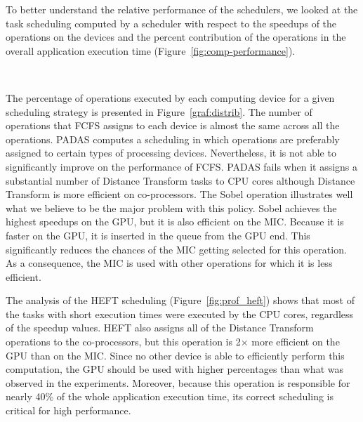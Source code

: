 To better understand the relative performance of the schedulers, we looked at the 
task scheduling computed by a scheduler with respect to the speedups of the operations 
on the devices and the percent 
contribution of the operations in the overall application execution time 
(Figure~\ref{fig:comp-performance}). 
\begin{figure*}[htb!]
\centering
\mbox{
}
\mbox{
}
\mbox{
}
\mbox{
}
\vspace{-1ex}
\caption{Task assignment profile for each of the operations executed in the image 
analysis application under different scheduling strategies. A fixed window size of 
$80$ is used in all runs.} 
\vspace{-1ex}
\label{graf:distrib}
\end{figure*}
The percentage of operations executed by each computing device for a given 
scheduling strategy is presented in Figure~\ref{graf:distrib}. The number of
operations that FCFS assigns to each device is almost the same across 
all the operations. PADAS computes a
scheduling in which operations are preferably assigned to certain types of
processing devices. Nevertheless, it is not able to significantly improve on 
the performance of FCFS. 
PADAS fails when 
it assigns a substantial number of
Distance Transform tasks to CPU cores although Distance Transform is more efficient 
on co-processors.
The Sobel operation illustrates well what we believe to be the major problem with
this policy. Sobel achieves the highest speedups on the GPU, but it is also efficient on
the MIC. Because it is faster on the GPU, it is inserted in the queue from the 
GPU end. This significantly reduces the chances of the MIC getting 
selected for this operation. As a consequence, the MIC is used with other
operations for which it is less efficient.

The analysis of the HEFT scheduling (Figure~\ref{fig:prof_heft}) shows that
most of the tasks with short execution times were executed by the CPU cores, 
regardless of the speedup values. HEFT also assigns all of the
Distance Transform operations to the co-processors, but this operation is
2$\times$ more efficient on the GPU than on the MIC. Since no other device is able to
efficiently perform this computation, the GPU should be used with higher
percentages than what was observed in the experiments. Moreover, 
because this operation is
responsible for nearly 40\% of the whole application execution time, its
correct scheduling is critical for high performance. 

